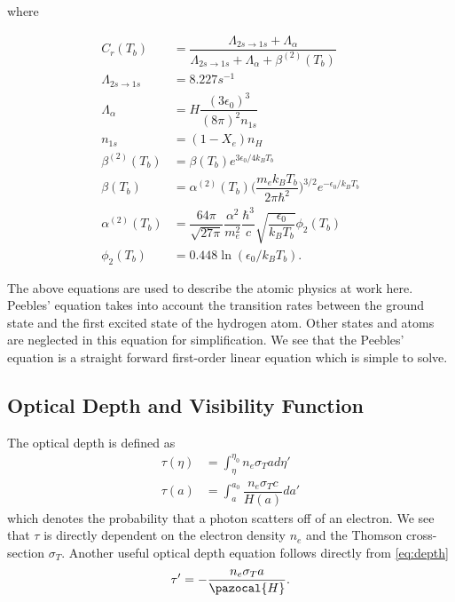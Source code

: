 \documentclass[twoside]{article}
\begin{document}
\noindent where

\begin{align}
C_r(T_b) &= \dfrac{\Lambda_{2s \rightarrow 1s}+\Lambda_{\alpha}}{\Lambda_{2s \rightarrow 1s}+\Lambda_{\alpha}+\beta^{(2)}(T_b)}\\
\Lambda_{2s \rightarrow 1s} &= 8.227s^{-1}\\
\Lambda_{\alpha} &= H\dfrac{(3\epsilon_0)^3}{(8 \pi)^2 n_{1s}}\\
n_{1s} &= (1-X_e)n_H\\
\beta^{(2)}(T_b) &= \beta(T_b)e^{3\epsilon_0/4k_BT_b}\\
\beta(T_b) &= \alpha^{(2)}(T_b)\Big(\dfrac{m_ek_BT_b}{2\pi\hbar^2}\Big)^{3/2}e^{-\epsilon_0/k_BT_b}\\
\alpha^{(2)}(T_b) &= \dfrac{64 \pi}{\sqrt{27 \pi}}\dfrac{\alpha^2}{m_e^2}\dfrac{\hbar^3}{c}\sqrt{\dfrac{\epsilon_0}{k_B T_b}} \phi_2(T_b)\\
\phi_2(T_b) &= 0.448 \ln (\epsilon_0/k_BT_b). 
\end{align}

The above equations are used to describe the atomic physics at work here. Peebles' equation takes into account the transition rates between the ground state and the first excited state of the hydrogen atom. Other states and atoms are neglected in this equation for simplification. We see that the Peebles' equation is a straight forward first-order linear equation which is simple to solve.\\

\subsection{Optical Depth and Visibility Function}\label{sec:optic}

The optical depth is defined as
\begin{align}\label{eq:depth}
\tau(\eta) &= \int_{\eta}^{\eta_0} n_e \sigma_Tad\eta'\\
\tau(a) &= \int_a^{a_0} \dfrac{n_e \sigma_T c}{H(a)}da'
\end{align}
which denotes the probability that a photon scatters off of an electron. We see that $\tau$ is directly dependent on the electron density $n_e$ and the Thomson cross-section $\sigma_T$. Another useful optical depth equation follows directly from \ref{eq:depth}
\begin{equation}\label{eq:depthderiv}
\tau' = -\dfrac{n_e\sigma_Ta}{\pazocal{H}}.
\end{equation}
\end{document}
